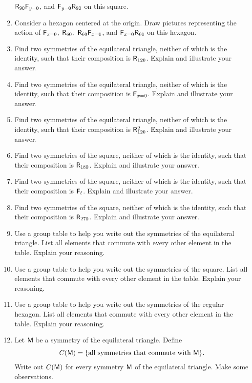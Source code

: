 \begin{enumerate}
  $\mathsf{R}_{90}\mathsf{F}_{y=0}$, and $\mathsf{F}_{y=0} \mathsf{R}_{90}$ on
  this square.
\item Consider a hexagon centered at the origin. Draw pictures
  representing the action of $\mathsf{F}_{x=0}$, $\mathsf{R}_{60}$,
  $\mathsf{R}_{60}\mathsf{F}_{x=0}$, and $\mathsf{F}_{x=0} \mathsf{R}_{60}$ on
  this hexagon.
\item Find two symmetries of the equilateral triangle, neither of
  which is the identity, such that their composition is
  $\mathsf{R}_{120}$. Explain and illustrate your answer.
\item Find two symmetries of the equilateral triangle, neither of
  which is the identity, such that their composition is
  $\mathsf{F}_{x=0}$. Explain and illustrate your answer.
\item Find two symmetries of the equilateral triangle, neither of
  which is the identity, such that their composition is
  $\mathsf{R}_{120}^2$. Explain and illustrate your answer.
\item Find two symmetries of the square, neither of which is the
  identity, such that their composition is $\mathsf{R}_{180}$. Explain
  and illustrate your answer.
\item Find two symmetries of the square, neither of which is the
  identity, such that their composition is $\mathsf{F}_{\ell}$. Explain
  and illustrate your answer.
\item Find two symmetries of the square, neither of which is the
  identity, such that their composition is $\mathsf{R}_{270}$. Explain
  and illustrate your answer.
\item Use a group table to help you write out the symmetries of the
  equilateral triangle. List all elements that commute with every
  other element in the table. Explain your reasoning.
\item Use a group table to help you write out the symmetries of the
  square. List all elements that commute with every other element in
  the table. Explain your reasoning.
\item Use a group table to help you write out the symmetries of the
  regular hexagon. List all elements that commute with every other
  element in the table. Explain your reasoning.
\item Let $\mathsf{M}$ be a symmetry of the equilateral triangle. Define
\[
C(\mathsf{M}) = \{\text{all symmetries that commute with $\mathsf{M}$}\}.
\]
Write out $C(\mathsf{M})$ for every symmetry $\mathsf{M}$ of the equilateral
triangle. Make some observations.
\end{enumerate}

